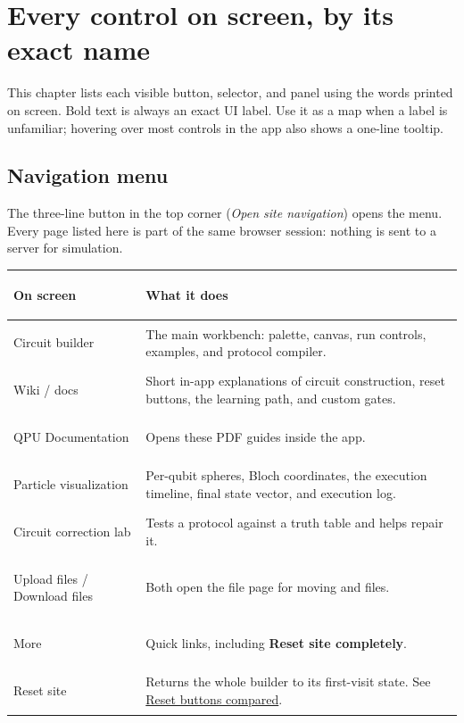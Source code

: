 \section{Every control on screen, by its exact name}
\hypertarget{ui-reference}{}

This chapter lists each visible button, selector, and panel using the words
printed on screen. Bold text is always an exact UI label. Use it as a map when
a label is unfamiliar; hovering over most controls in the app also shows a
one-line tooltip.

\newcommand{\UiTable}[1]{%
\begin{center}
\begin{tabularx}{\textwidth}{>{\bfseries\raggedright\arraybackslash}p{0.27\textwidth}X}
\toprule
\normalfont\bfseries On screen & \bfseries What it does\\
\midrule
#1
\bottomrule
\end{tabularx}
\end{center}}

\subsection{Navigation menu}
\hypertarget{ui-navigation}{}

The three-line button in the top corner (\emph{Open site navigation}) opens
the menu. Every page listed here is part of the same browser session: nothing
is sent to a server for simulation.

\UiTable{
Circuit builder & The main workbench: palette, canvas, run controls,
examples, and protocol compiler.\\
Wiki / docs & Short in-app explanations of circuit construction, reset
buttons, the learning path, and custom gates.\\
QPU Documentation & Opens these PDF guides inside the app.\\
Particle visualization & Per-qubit spheres, Bloch coordinates, the execution
timeline, final state vector, and execution log.\\
Circuit correction lab & Tests a protocol against a truth table and helps
repair it.\\
Upload files / Download files & Both open the file page for moving
\code{.qpucir} and \code{.qpuio} files.\\
More & Quick links, including \textbf{Reset site completely}.\\
Reset site & Returns the whole builder to its first-visit state. See
\hyperlink{reset-buttons}{Reset buttons compared}.\\
}

